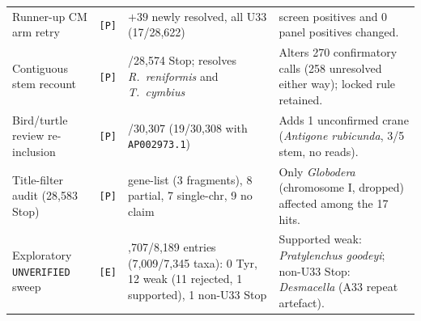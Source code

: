 \documentclass[11pt, a4paper]{article}
\begin{document}
\begin{table}[htbp]
\begin{tabularx}{\textwidth}{
  >{\raggedright\arraybackslash}p{4.0cm}
  c
  >{\raggedright\arraybackslash}p{4.3cm}
  >{\raggedright\arraybackslash}X
}
Runner-up CM arm retry & \texttt{[P]} & $+39$ newly resolved, all U33 (17/28,622) & 0 screen positives and 0 panel positives changed. \\
Contiguous stem recount & \texttt{[P]} & 17/28,574 Stop; resolves \textit{R.\ reniformis} and \textit{T.\ cymbius} & Alters 270 confirmatory calls (258 unresolved either way); locked rule retained. \\
Bird/turtle review re-inclusion & \texttt{[P]} & 18/30,307 (19/30,308 with \texttt{AP002973.1}) & Adds 1 unconfirmed crane (\textit{Antigone rubicunda}, 3/5 stem, no reads). \\
Title-filter audit (28,583 Stop) & \texttt{[P]} & 26 gene-list (3 fragments), 8 partial, 7 single-chr, 9 no claim & Only \textit{Globodera} (chromosome I, dropped) affected among the 17 hits. \\
Exploratory \texttt{UNVERIFIED} sweep & \texttt{[E]} & 7,707/8,189 entries (7,009/7,345 taxa): 0 Tyr, 12 weak (11 rejected, 1 supported), 1 non-U33 Stop & Supported weak: \textit{Pratylenchus goodeyi}; non-U33 Stop: \textit{Desmacella} (A33 repeat artefact). \\
\bottomrule
\end{tabularx}
\end{table}
\end{document}

